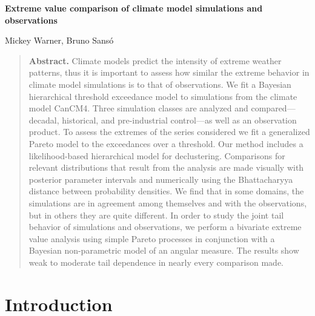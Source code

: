 \begin{Large}
\noindent \textbf{Extreme value comparison of climate model simulations and observations}
\end{Large}
\bigskip

\noindent Mickey Warner, Bruno Sans{\'o}


\bigskip
\bigskip
\begin{quote}
\textbf{Abstract.}
Climate models predict the intensity of extreme weather patterns, thus it is important to assess how similar the extreme behavior in climate model simulations is to that of observations.
We fit a Bayesian hierarchical threshold exceedance model to simulations from the climate model CanCM4.
Three simulation classes are analyzed and compared---decadal, historical, and pre-industrial control---as well as an observation product. 
To assess the extremes of the series considered we fit a generalized Pareto model to the exceedances over a threshold.
Our method includes a likelihood-based hierarchical model for declustering.
Comparisons for relevant distributions that result from the analysis are made visually with posterior parameter intervals and numerically using the Bhattacharyya distance between probability densities.
We find that in some domains, the simulations are in agreement among themselves and with the observations, but in others they are quite different.
In order to study the joint tail behavior of simulations and observations, we perform a bivariate extreme value analysis using simple Pareto processes in conjunction with a Bayesian non-parametric model of an angular measure.
The results show weak to moderate tail dependence in nearly every comparison made.
\end{quote}


\section{Introduction}
\label{intro}


